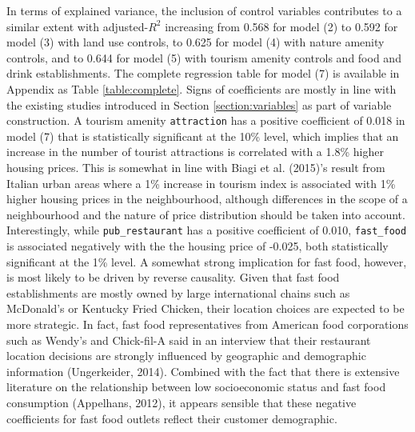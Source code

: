 \documentclass{article}
\begin{document}
In terms of explained variance, the inclusion of control variables contributes to a similar extent with adjusted-$R^2$ increasing from 0.568 for model (2) to 0.592 for model (3) with land use controls, to 0.625 for model (4) with nature amenity controls, and to 0.644 for model (5) with tourism amenity controls and food and drink establishments. The complete regression table for model (7) is available in Appendix as Table \ref{table:complete}. Signs of coefficients are mostly in line with the existing studies introduced in Section \ref{section:variables} as part of variable construction. A tourism amenity \texttt{attraction} has a positive coefficient of 0.018 in model (7) that is statistically significant at the 10\% level, which implies that an increase in the number of tourist attractions is correlated with a 1.8\% higher housing prices. This is somewhat in line with Biagi et al. (2015)'s result from Italian urban areas where a 1\% increase in tourism index is associated with 1\% higher housing prices in the neighbourhood, although differences in the scope of a neighbourhood and the nature of price distribution should be taken into account.  Interestingly, while \texttt{pub\_restaurant} has a positive coefficient of 0.010, \texttt{fast\_food} is associated negatively with the the housing price of -0.025, both statistically significant at the 1\% level. A somewhat strong implication for fast food, however, is most likely to be driven by reverse causality. Given that fast food establishments are mostly owned by large international chains such as McDonald's or Kentucky Fried Chicken, their location choices are expected to be more strategic. In fact, fast food representatives from American food corporations such as Wendy's and Chick-fil-A said in an interview that their restaurant location decisions are strongly influenced by geographic and demographic information (Ungerkeider, 2014). Combined with the fact that there is extensive literature on the relationship between low socioeconomic status and fast food consumption (Appelhans, 2012), it appears sensible that these negative coefficients for fast food outlets reflect their customer demographic.\\\\
\end{document}
